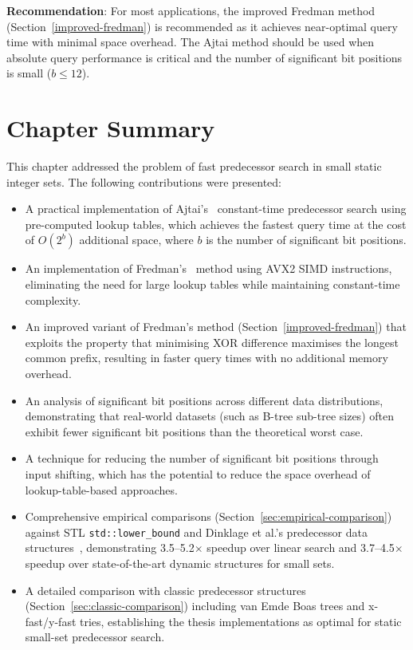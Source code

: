 \textbf{Recommendation}: For most applications, the improved Fredman method (Section~\ref{improved-fredman}) is recommended as it achieves near-optimal query time with minimal space overhead. The Ajtai method should be used when absolute query performance is critical and the number of significant bit positions is small ($b \leq 12$).

\FloatBarrier
\section{Chapter Summary}
This chapter addressed the problem of fast predecessor search in small static integer sets. The following contributions were presented:

\begin{itemize}
    \item A practical implementation of Ajtai's~\cite{AJTAI1984217} constant-time predecessor search using pre-computed lookup tables, which achieves the fastest query time at the cost of $O(2^b)$ additional space, where $b$ is the number of significant bit positions.

    \item An implementation of Fredman's~\cite{FREDMAN1993424} method using AVX2 SIMD instructions, eliminating the need for large lookup tables while maintaining constant-time complexity.

    \item An improved variant of Fredman's method (Section~\ref{improved-fredman}) that exploits the property that minimising XOR difference maximises the longest common prefix, resulting in faster query times with no additional memory overhead.

    \item An analysis of significant bit positions across different data distributions, demonstrating that real-world datasets (such as B-tree sub-tree sizes) often exhibit fewer significant bit positions than the theoretical worst case.

    \item A technique for reducing the number of significant bit positions through input shifting, which has the potential to reduce the space overhead of lookup-table-based approaches.

    \item Comprehensive empirical comparisons (Section~\ref{sec:empirical-comparison}) against STL \texttt{std::lower\_bound} and Dinklage et al.'s predecessor data structures~\cite{Patrick_2021}, demonstrating 3.5--5.2$\times$ speedup over linear search and 3.7--4.5$\times$ speedup over state-of-the-art dynamic structures for small sets.

    \item A detailed comparison with classic predecessor structures (Section~\ref{sec:classic-comparison}) including van Emde Boas trees and x-fast/y-fast tries, establishing the thesis implementations as optimal for static small-set predecessor search.
\end{itemize}

